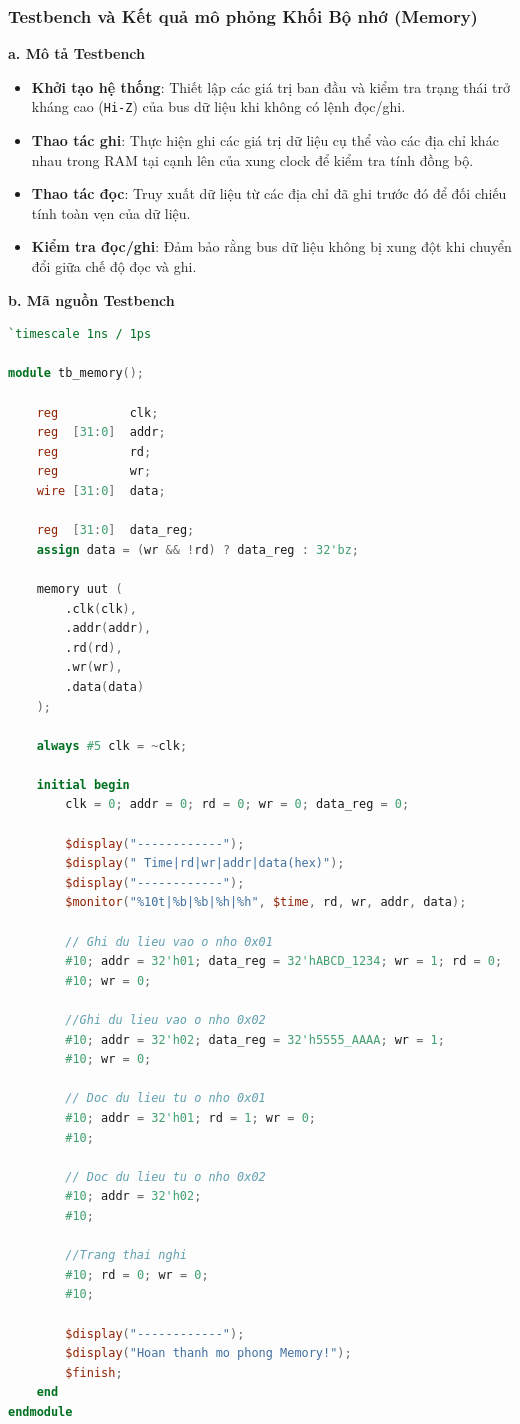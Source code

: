 \subsubsection{Testbench và Kết quả mô phỏng Khối Bộ nhớ (Memory)}

\textbf{a. Mô tả Testbench} \\
\begin{itemize}
    \item \textbf{Khởi tạo hệ thống}: Thiết lập các giá trị ban đầu và kiểm tra trạng thái trở kháng cao (\texttt{Hi-Z}) 
    của bus dữ liệu khi không có lệnh đọc/ghi.
    \item \textbf{Thao tác ghi}: Thực hiện ghi các giá trị dữ liệu cụ thể vào các địa chỉ khác nhau trong RAM 
    tại cạnh lên của xung clock để kiểm tra tính đồng bộ.
    \item \textbf{Thao tác đọc}: Truy xuất dữ liệu từ các địa chỉ đã 
    ghi trước đó để đối chiếu tính toàn vẹn của dữ liệu.
    \item \textbf{Kiểm tra đọc/ghi}: Đảm bảo rằng bus dữ liệu không bị xung đột khi chuyển đổi giữa chế độ đọc và ghi.
\end{itemize}

\textbf{b. Mã nguồn Testbench}
\begin{lstlisting}[language=Verilog, caption={Testbench Memory}]
`timescale 1ns / 1ps

module tb_memory();

    reg          clk;
    reg  [31:0]  addr;
    reg          rd;
    reg          wr;
    wire [31:0]  data;

    reg  [31:0]  data_reg;
    assign data = (wr && !rd) ? data_reg : 32'bz;

    memory uut (
        .clk(clk),
        .addr(addr),
        .rd(rd),
        .wr(wr),
        .data(data)
    );

    always #5 clk = ~clk;

    initial begin
        clk = 0; addr = 0; rd = 0; wr = 0; data_reg = 0;

        $display("------------");
        $display(" Time|rd|wr|addr|data(hex)");
        $display("------------");
        $monitor("%10t|%b|%b|%h|%h", $time, rd, wr, addr, data);

        // Ghi du lieu vao o nho 0x01
        #10; addr = 32'h01; data_reg = 32'hABCD_1234; wr = 1; rd = 0;
        #10; wr = 0; 

        //Ghi du lieu vao o nho 0x02
        #10; addr = 32'h02; data_reg = 32'h5555_AAAA; wr = 1;
        #10; wr = 0;

        // Doc du lieu tu o nho 0x01
        #10; addr = 32'h01; rd = 1; wr = 0;
        #10; 
        
        // Doc du lieu tu o nho 0x02
        #10; addr = 32'h02;
        #10;

        //Trang thai nghi
        #10; rd = 0; wr = 0;
        #10;

        $display("------------");
        $display("Hoan thanh mo phong Memory!");
        $finish;
    end
endmodule
\end{lstlisting}

